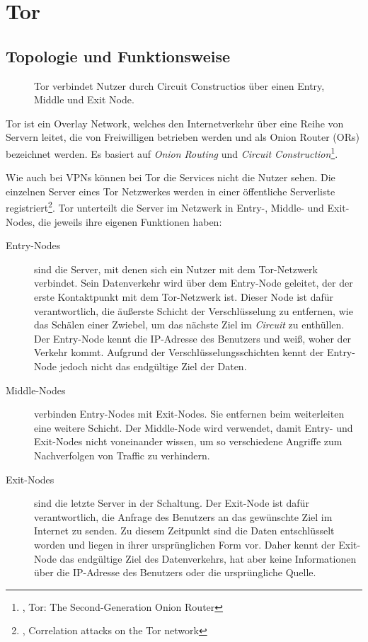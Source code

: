 \section{Tor}
\label{chap:tor}

\subsection{Topologie und Funktionsweise}
\label{chap:tor_topology}
 
\begin{figure}[h!]
    \centering
    
    \caption{Tor verbindet Nutzer durch Circuit Constructios über einen Entry, Middle und Exit Node.}
    \label{imgs:tor}
\end{figure}

Tor ist ein Overlay Network, welches den Internetverkehr über eine Reihe von Servern leitet, die von Freiwilligen betrieben werden und als Onion Router (ORs) bezeichnet werden. Es basiert auf \textit{Onion Routing} und \textit{Circuit Construction}\footnote{\cite{TorWhitePaper}, Tor: The Second-Generation Onion Router}.

Wie auch bei VPNs können bei Tor die Services nicht die Nutzer sehen. Die einzelnen Server eines Tor Netzwerkes werden in einer öffentliche Serverliste registriert\footnote{\cite{CorrelationAttackTor}, Correlation attacks on the Tor network}. Tor unterteilt die Server im Netzwerk in Entry-, Middle- und Exit-Nodes, die jeweils ihre eigenen Funktionen haben:

\begin{description}
    \item[Entry-Nodes] sind die Server, mit denen sich ein Nutzer mit dem Tor-Netzwerk verbindet. Sein Datenverkehr wird über dem Entry-Node geleitet, der der erste Kontaktpunkt mit dem Tor-Netzwerk ist. Dieser Node ist dafür verantwortlich, die äußerste Schicht der Verschlüsselung zu entfernen, wie das Schälen einer Zwiebel, um das nächste Ziel im \textit{Circuit} zu enthüllen. Der Entry-Node kennt die IP-Adresse des Benutzers und weiß, woher der Verkehr kommt. Aufgrund der Verschlüsselungsschichten kennt der Entry-Node jedoch nicht das endgültige Ziel der Daten.
    \item[Middle-Nodes] verbinden Entry-Nodes mit Exit-Nodes. Sie entfernen beim weiterleiten eine weitere Schicht. Der Middle-Node wird verwendet, damit Entry- und Exit-Nodes nicht voneinander wissen, um so verschiedene Angriffe zum Nachverfolgen von Traffic zu verhindern.
    \item[Exit-Nodes] sind  die letzte Server in der Schaltung. Der Exit-Node ist dafür verantwortlich, die Anfrage des Benutzers an das gewünschte Ziel im Internet zu senden. Zu diesem Zeitpunkt sind die Daten entschlüsselt worden und liegen in ihrer ursprünglichen Form vor. Daher kennt der Exit-Node das endgültige Ziel des Datenverkehrs, hat aber keine Informationen über die IP-Adresse des Benutzers oder die ursprüngliche Quelle.
\end{description}

